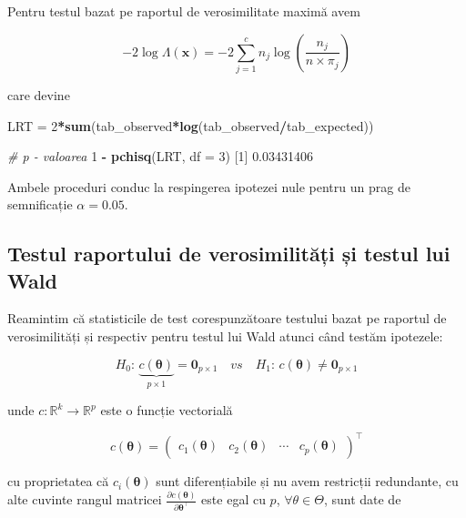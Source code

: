 \documentclass[]{article}
\newenvironment{Shaded}{\begin{snugshade}}{\end{snugshade}}
\newcommand{\CommentTok}[1]{\textcolor[rgb]{0.56,0.35,0.01}{\textit{#1}}}
\newcommand{\DataTypeTok}[1]{\textcolor[rgb]{0.13,0.29,0.53}{#1}}
\newcommand{\DecValTok}[1]{\textcolor[rgb]{0.00,0.00,0.81}{#1}}
\newcommand{\FloatTok}[1]{\textcolor[rgb]{0.00,0.00,0.81}{#1}}
\newcommand{\KeywordTok}[1]{\textcolor[rgb]{0.13,0.29,0.53}{\textbf{#1}}}
\newcommand{\NormalTok}[1]{#1}
\newcommand{\OperatorTok}[1]{\textcolor[rgb]{0.81,0.36,0.00}{\textbf{#1}}}
\newcommand{\StringTok}[1]{\textcolor[rgb]{0.31,0.60,0.02}{#1}}
\begin{document}
Pentru testul bazat pe raportul de verosimilitate maximă avem

\[
  -2\log \Lambda(\mathbf{x}) = -2\sum_{j = 1}^{c} n_{j}\log\left(\frac{n_{j}}{n\times \pi_{j}}\right)
\]

care devine

\begin{Shaded}
\begin{Highlighting}[]
\NormalTok{LRT =}\StringTok{ }\DecValTok{2}\OperatorTok{*}\KeywordTok{sum}\NormalTok{(tab_observed}\OperatorTok{*}\KeywordTok{log}\NormalTok{(tab_observed}\OperatorTok{/}\NormalTok{tab_expected))}

\CommentTok{# p - valoarea}
\DecValTok{1} \OperatorTok{-}\StringTok{ }\KeywordTok{pchisq}\NormalTok{(LRT, }\DataTypeTok{df =} \DecValTok{3}\NormalTok{)}
\NormalTok{[}\DecValTok{1}\NormalTok{] }\FloatTok{0.03431406}
\end{Highlighting}
\end{Shaded}

Ambele proceduri conduc la respingerea ipotezei nule pentru un prag de
semnificație \(\alpha = 0.05\).

\hypertarget{testul-raportului-de-verosimilitati-si-testul-lui-wald}{%
\subsection{Testul raportului de verosimilități și testul lui
Wald}\label{testul-raportului-de-verosimilitati-si-testul-lui-wald}}

Reamintim că statisticile de test corespunzătoare testului bazat pe
raportul de verosimilități și respectiv pentru testul lui Wald atunci
când testăm ipotezele:

\[
H_0:\, \underbrace{c(\boldsymbol{\theta})}_{p\times 1} = \boldsymbol{0}_{p\times 1} \quad vs\quad H_1:\, c(\boldsymbol{\theta})\neq \boldsymbol{0}_{p\times 1}
\]

unde \(c:\mathbb{R}^k\to\mathbb{R}^p\) este o funcție vectorială

\[
c(\boldsymbol{\theta}) = \begin{pmatrix}c_1(\boldsymbol{\theta}) & c_2(\boldsymbol{\theta}) &\cdots & c_p(\boldsymbol{\theta})\end{pmatrix}^\intercal
\]

cu proprietatea că \(c_i(\boldsymbol{\theta})\) sunt diferențiabile și
nu avem restricții redundante, cu alte cuvinte rangul matricei
\(\frac{\partial c(\boldsymbol{\theta})}{\partial \boldsymbol{\theta}^\intercal}\)
este egal cu \(p\), \(\forall\theta\in\Theta\), sunt date de
\end{document}
